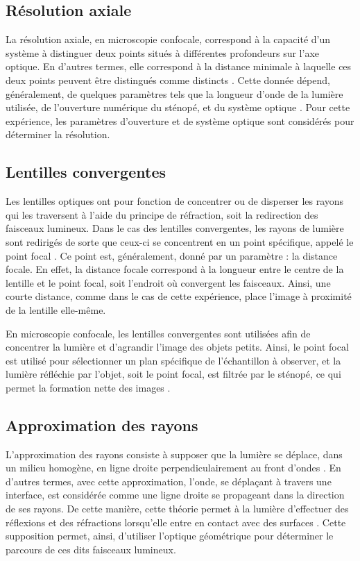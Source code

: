 \documentclass[11pt,letterpaper]{article}
\begin{document}
\subsection{Résolution axiale}
La résolution axiale, en microscopie confocale, correspond à la capacité d'un système à distinguer deux
points situés à différentes profondeurs sur l'axe optique. En d'autres termes, elle correspond à la
distance minimale à laquelle ces deux points peuvent être distingués comme distincts
\cite{fouquet_improving_2015}. Cette donnée dépend, généralement, de quelques paramètres tels que la
longueur d'onde de la lumière utilisée, de l'ouverture numérique du sténopé, et du système optique
\cite{jonkman_18_2003}. Pour cette expérience, les paramètres d'ouverture et de système optique sont
considérés pour déterminer la résolution.

\subsection{Lentilles convergentes}
Les lentilles optiques ont pour fonction de concentrer ou de disperser les rayons qui les traversent à 
l'aide du principe de réfraction, soit la redirection des faisceaux lumineux. Dans le cas des lentilles 
convergentes, les rayons de lumière sont redirigés de sorte que ceux-ci se concentrent en un point 
spécifique, appelé le point focal \cite{noauthor_thin_nodate}. Ce point est, généralement, donné par 
un paramètre : la distance focale. En effet, la distance focale correspond à la longueur entre le
centre de la lentille et le point focal, soit l'endroit où convergent les faisceaux. Ainsi, une courte
distance, comme dans le cas de cette expérience, place l'image à proximité de la lentille elle-même.

En microscopie confocale, les lentilles convergentes sont utilisées afin de concentrer la lumière et 
d'agrandir l'image des objets petits. Ainsi, le point focal est utilisé pour sélectionner un plan 
spécifique de l'échantillon à observer, et la lumière réfléchie par l'objet, soit le point focal, 
est filtrée par le sténopé, ce qui permet la formation nette des images \cite{noauthor_lens_2024}.

\subsection{Approximation des rayons}
L'approximation des rayons consiste à supposer que la lumière se déplace, dans un milieu homogène, 
en ligne droite perpendiculairement au front d'ondes \cite{qaid_nature_nodate}. En d'autres termes,
avec cette approximation, l'onde, se déplaçant à travers une interface, est considérée comme une ligne
droite se propageant dans la direction de ses rayons. De cette manière, cette théorie permet à la
lumière d'effectuer des réflexions et des réfractions lorsqu'elle entre en contact avec des surfaces
\cite{vesina_optique_nodate}. Cette supposition permet, ainsi, d'utiliser l'optique géométrique pour 
déterminer le parcours de ces dits faisceaux lumineux. 
\end{document}
